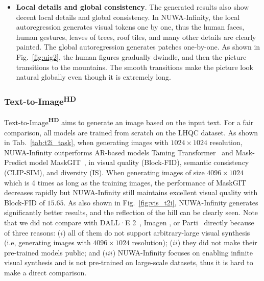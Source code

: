 \documentclass{article}
\begin{document}
\begin{itemize}[leftmargin=*]
\item \textbf{Local details and global consistency}. The generated results also show decent local details and global consistency. In NUWA-Infinity, the local autoregression generates visual tokens one by one, thus the human faces, human gestures, leaves of trees, roof tiles, and many other details are clearly painted. The global autoregression generates patches one-by-one. As shown in Fig.~\ref{fig:uig2}, the human figures gradually dwindle, and then the picture transitions to the mountains. The smooth transitions make the picture look natural globally even though it is extremely long.

\end{itemize}


























\subsubsection{Text-to-Image\textsuperscript{\textbf{HD}}}
Text-to-Image\textsuperscript{\textbf{HD}} aims to generate an image based on the input text. For a fair comparison, all models are trained from scratch on the LHQC dataset. As shown in Tab.~\ref{tab:t2i_task}, when generating images with $1024 \times 1024$ resolution, NUWA-Infinity outperforms AR-based models Taming Transformer~\cite{esserTamingTransformersHighResolution2021} and Mask-Predict model MaskGIT~\cite{changMaskGITMaskedGenerative2022}, in visual quality (Block-FID), semantic consistency (CLIP-SIM), and diversity (IS). When generating images of size  $4096\times 1024$ which is 4 times as long as the training images, the performance of MaskGIT \cite{changMaskGITMaskedGenerative2022} decreases rapidly but NUWA-Infinity still maintains excellent visual quality with Block-FID of $15.65$. As also shown in Fig.~\ref{fig:vis_t2i}, NUWA-Infinity generates significantly better results, and the reflection of the hill can be clearly seen. Note that we did not compare with DALL·E 2~\cite{rameshHierarchicalTextConditionalImage2022}, Imagen \cite{sahariaPhotorealisticTexttoImageDiffusion2022}, or Parti~\cite{yuScalingAutoregressiveModels2022} directly because of three reasons: ($i$) all of them do not support arbitrary-large visual synthesis (i.e, generating images with $4096\times 1024$ resolution);  ($ii$) they did not make their pre-trained models public; and ($iii$) NUWA-Infinity focuses on enabling infinite visual synthesis and is not pre-trained on large-scale datasets, thus it is hard to make a direct comparison.
\end{document}
